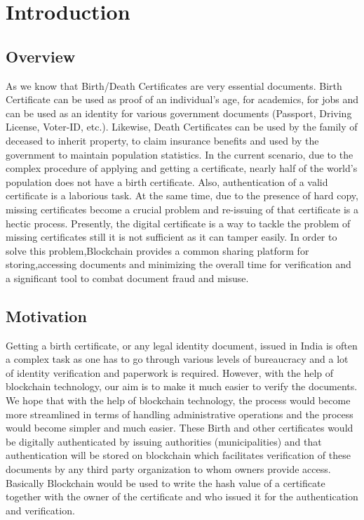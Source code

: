 \chapter{Introduction}
\section{Overview}
As we know that Birth/Death Certificates are very essential documents. Birth Certificate can be used as proof of an individual’s age, for academics, for jobs and can be used as an identity for various government documents (Passport, Driving License, Voter-ID, etc.). Likewise, Death Certificates can be used by the family of deceased to inherit property, to claim insurance benefits and used by the government to maintain population statistics. In the current scenario, due to the complex procedure of applying and getting a certificate, nearly half of the world’s population does not have a birth certificate. Also, authentication of a valid certificate is a laborious task. At the same time, due to the presence of hard copy, missing certificates become a crucial problem and re-issuing of that certificate is a hectic process. Presently, the digital certificate is a way to tackle the problem of missing certificates still it is not sufficient as it can tamper easily.
In order to solve this problem,Blockchain provides a common sharing platform for storing,accessing documents and minimizing the overall time for verification and a significant tool to combat document fraud and misuse.


\section{Motivation}
Getting a birth certificate, or any legal identity document, issued in India is often a complex task as one has to go through various levels of bureaucracy and a lot of identity verification and paperwork is required. However, with the help of blockchain technology, our aim is to make it much easier to verify the documents. We hope that with the help of blockchain technology, the process would become more streamlined in terms of handling administrative operations and the process would become simpler and much easier. These Birth and other certificates would be digitally authenticated by issuing authorities (municipalities) and that authentication will be stored on blockchain which facilitates verification of these documents by any third party organization to whom owners provide access. Basically Blockchain would be used to write the hash value of a certificate together with the owner of the certificate and who issued it for the authentication and verification.

